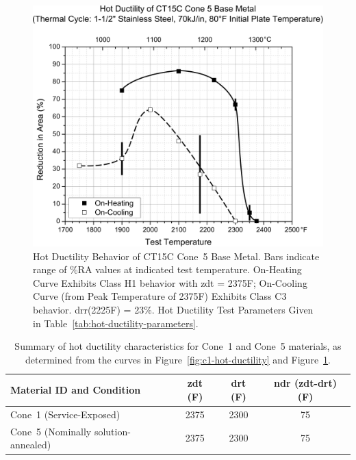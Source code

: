\begin{figure}[h!]
\setlength{\abovecaptionskip}{15pt}
\centering
\includegraphics[width=6in]{figures/hot-ductility/c5-hot-ductility-curve.pdf}
\caption[Hot Ductility Behavior of Cone~5 Base Metal.]{Hot Ductility Behavior of CT15C Cone~5 Base Metal.  Bars indicate range of \%RA values at indicated test temperature.  On-Heating Curve Exhibits Class H1 behavior with \gls{zdt} = 2375\textdegree{}F; On-Cooling Curve (from Peak Temperature of 2375\textdegree{}F) Exhibits Class C3 behavior.  \gls{drr}(2225\textdegree{}F) = 23\%. Hot Ductility Test Parameters Given in Table~\ref{tab:hot-ductility-parameters}.}
\label{fig:c5-hot-ductility}
\end{figure}

\begin{table}[h]
\caption{Summary of hot ductility characteristics for Cone~1 and Cone~5 materials, as determined from the curves in Figure~\ref{fig:c1-hot-ductility} and Figure~\ref{fig:c5-hot-ductility}.}
\begin{tabular}{ lccc }
\toprule
\textbf{Material ID and Condition} & \textbf{\gls{zdt} (F)} & \textbf{\gls{drt} (F)} & \textbf{\gls{ndr} (\gls{zdt}-\gls{drt}) (F)} \\
\midrule
Cone~1 (Service-Exposed) & 2375 & 2300 & 75 \\
Cone~5 (Nominally solution-annealed) & 2375 & 2300 & 75 \\
\bottomrule
\end{tabular}
\label{tab:hot-ductility-results}
\end{table}

